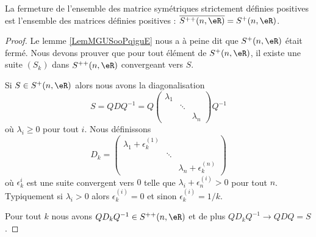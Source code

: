 \begin{lemma}   \label{LemZKJWqIP}
    La fermeture de l'ensemble des matrice symétriques strictement définies positives est l'ensemble des matrices définies positives : \( \overline{ S^{++}(n,\eR) }=S^+(n,\eR)\).
\end{lemma}

\begin{proof}
    Le lemme \ref{LemMGUSooPqjguE} nous a à peine dit que \( S^+(n,\eR)\) était fermé. Nous devons prouver que pour tout élément de \( S^+(n,\eR)\), il existe une suite \( (S_k)\) dans \( S^{++}(n,\eR)\) convergeant vers \( S\).

    Si \( S\in S^+(n,\eR)\) alors nous avons la diagonalisation
    \begin{equation}
        S=QDQ^{-1} =Q
        \begin{pmatrix}
            \lambda_1    &       &       \\
                &   \ddots    &       \\
                &       &   \lambda_n
        \end{pmatrix}
        Q^{-1}
    \end{equation}
    où \( \lambda_i\geq 0\) pour tout \( i\). Nous définissons
    \begin{equation}
        D_k=
        \begin{pmatrix}
            \lambda_1+\epsilon^{(1)}_k    &       &       \\
                &   \ddots    &       \\
                &       &   \lambda_n+\epsilon^{(n)}_k
        \end{pmatrix}
    \end{equation}
    où \( \epsilon^{i}_k\) est une suite convergent vers \( 0\) telle que \( \lambda_i+\epsilon^{(i)}_n>0\) pour tout \( n\). Typiquement si \( \lambda_i>0\) alors \( \epsilon^{(i)}_k=0\) et sinon \( \epsilon^{(i)}_k=1/k\).

    Pour tout \( k\) nous avons \( QD_kQ^{-1}\in S^{++}(n,\eR)\) et de plus \( QD_kQ^{-1}\to QDQ=S\).
\end{proof}

